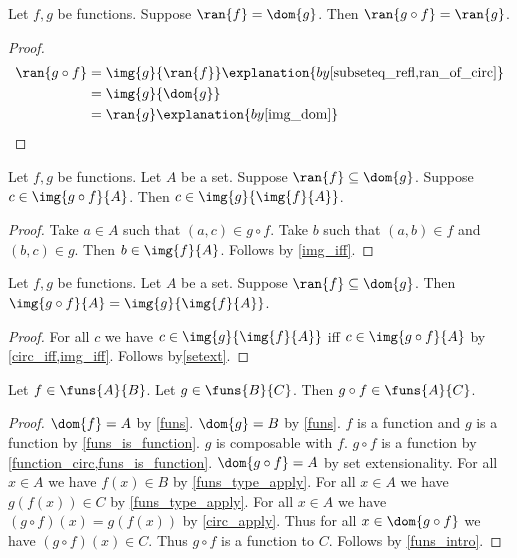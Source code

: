 \begin{proposition}\label{ran_circ_exact}
    Let $f, g$ be functions.
    Suppose $\ran{f} = \dom{g}$.
    Then $\ran{g\circ f} = \ran{g}$.
\end{proposition}
\begin{proof}
    \begin{align*}
        \ran{g\circ f}
        &= \img{g}{\ran{f}}
            \explanation{by \cref{subseteq_refl,ran_of_circ}}\\
        &= \img{g}{\dom{g}}
            \\ %
        &= \ran{g}
            \explanation{by \cref{img_dom}}
    \end{align*}
\end{proof}


\begin{proposition}\label{img_of_circ_elim}
    Let $f, g$ be functions.
    Let $A$ be a set.
    Suppose $\ran{f}\subseteq \dom{g}$.
    Suppose $c\in\img{g\circ f}{A}$.
    Then $c\in\img{g}{\img{f}{A}}$.
\end{proposition}
\begin{proof}
    Take $a\in A$ such that $(a,c)\in g\circ f$.
    Take $b$ such that $(a,b)\in f$ and $(b, c)\in g$.
    Then $b\in\img{f}{A}$.
    Follows by \cref{img_iff}.
\end{proof}

\begin{proposition}\label{img_of_circ}
    Let $f, g$ be functions.
    Let $A$ be a set.
    Suppose $\ran{f}\subseteq\dom{g}$.
    Then $\img{g\circ f}{A} = \img{g}{\img{f}{A}}$.
\end{proposition}
\begin{proof}
    For all $c$ we have $c\in\img{g}{\img{f}{A}}$
        iff $c\in\img{g\circ f}{A}$
        by \cref{circ_iff,img_iff}.
    Follows by\cref{setext}.
\end{proof}

\begin{proposition}\label{funs_circ}
    Let $f\in\funs{A}{B}$.
    Let $g\in\funs{B}{C}$.
    Then $g\circ f\in\funs{A}{C}$.
\end{proposition}
\begin{proof}
    $\dom{f} = A$ by \cref{funs}.
    $\dom{g} = B$ by \cref{funs}.
    $f$ is a function and $g$ is a function by \cref{funs_is_function}.
    $g$ is composable with $f$.
    $g\circ f$ is a function by \cref{function_circ,funs_is_function}.
    $\dom{g\circ f} = A$ by set extensionality.
    For all $x\in A$ we have $f(x)\in B$ by \cref{funs_type_apply}.
    For all $x\in A$ we have $g(f(x))\in C$ by \cref{funs_type_apply}.
    For all $x\in A$ we have $(g\circ f)(x)=g(f(x))$ by \cref{circ_apply}.
    Thus for all $x\in\dom{g\circ f}$ we have $(g\circ f)(x)\in C$.
    Thus $g\circ f$ is a function to $C$.
    Follows by \cref{funs_intro}.
\end{proof}

